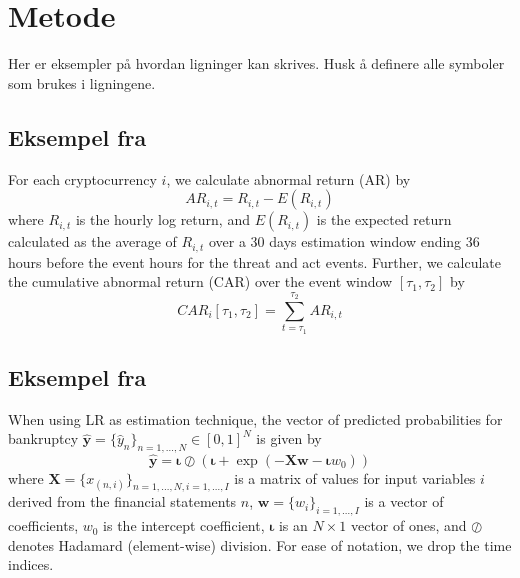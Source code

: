 \chapter{Metode}

Her er eksempler på hvordan ligninger kan skrives. Husk å definere alle symboler som brukes i ligningene.

\section{Eksempel fra \cite{kamal_cryptocurrencies_2023}}

For each cryptocurrency $i$, we calculate abnormal return (AR) by 
\begin{equation}\label{eq:AR}
    AR_{i,t} = R_{i,t} - E\left(R_{i,t}\right)
\end{equation}
where $R_{i,t}$ is the hourly log return, and $E\left(R_{i,t}\right)$ is the expected return calculated as the average of $R_{i,t}$ over a 30 days estimation window ending 36 hours before the event hours for the threat and act events. Further, we calculate the cumulative abnormal return (CAR) over the event window $\left[ \tau_1,\tau_2 \right]$ by
\begin{equation}
    CAR_i\left[ \tau_1,\tau_2 \right] = \sum_{t=\tau_1}^{\tau_2} AR_{i,t} 
\end{equation}

\section{Eksempel fra \cite{paraschiv_bankruptcy_2021}}


When using LR as estimation technique, the vector of predicted probabilities for bankruptcy $\mathbf{\hat{y}}=\{\hat{y}_n\}_{n=1,\dots,N} \in [0,1]^N$ 
is given by
\begin{equation}\label{LR:predicted probability}
\mathbf{\hat{y}} = \mathbf{\iota} \oslash \left( \mathbf{\iota} +\exp\left(- \mathbf{X} \mathbf{w} - \mathbf{\iota} w_0 \right) \right)
\end{equation}
where $\mathbf{X}=\{x_{(n,i)}\}_{n=1,\dots,N,i=1,\dots,I}$ is a matrix of values for input variables $i$ derived from the financial statements $n$, $\mathbf{w}=\{w_i\}_{i=1,\dots,I}$ is a vector of coefficients, $w_0$ is the intercept coefficient, $\mathbf{\iota}$ is an $N \times 1$ vector of ones, and $\oslash$ denotes Hadamard (element-wise) division. For ease of notation, we drop the time indices. 